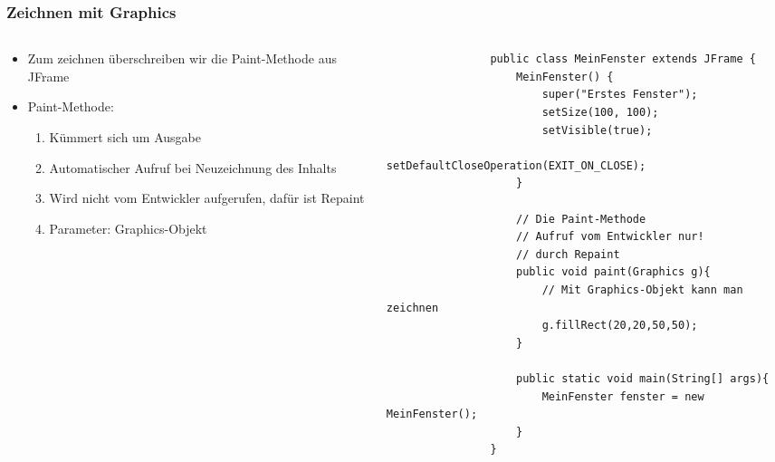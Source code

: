 \begin{frame}[fragile]
	\frametitle{Zeichnen mit Graphics}
	\begin{columns}
		\begin{column}{0.5\textwidth}
			\small
			\begin{itemize}
			  \item Zum zeichnen \"uberschreiben wir die
			  Paint-Methode aus JFrame
			  \item Paint-Methode:
			  	\begin{enumerate}
			  	  \item K\"ummert sich um Ausgabe
			  	  \item Automatischer Aufruf bei Neuzeichnung
			  	  des Inhalts
			  	  \item Wird nicht vom Entwickler aufgerufen,
			  	  daf\"ur ist Repaint
			  	  \item Parameter: Graphics-Objekt
			  	\end{enumerate}
	\end{itemize}
	\end{column}
		\begin{column}{0.5\textwidth}
			\begin{lstlisting}
				public class MeinFenster extends JFrame {
					MeinFenster() {
						super("Erstes Fenster");
						setSize(100, 100);
						setVisible(true);
						setDefaultCloseOperation(EXIT_ON_CLOSE);
					}
					
					// Die Paint-Methode
					// Aufruf vom Entwickler nur!  
					// durch Repaint
					public void paint(Graphics g){
						// Mit Graphics-Objekt kann man zeichnen
						g.fillRect(20,20,50,50);
					}
					
					public static void main(String[] args){
						MeinFenster fenster = new MeinFenster();
					}
				}
			\end{lstlisting}
		\end{column}
	\end{columns}
\end{frame}

